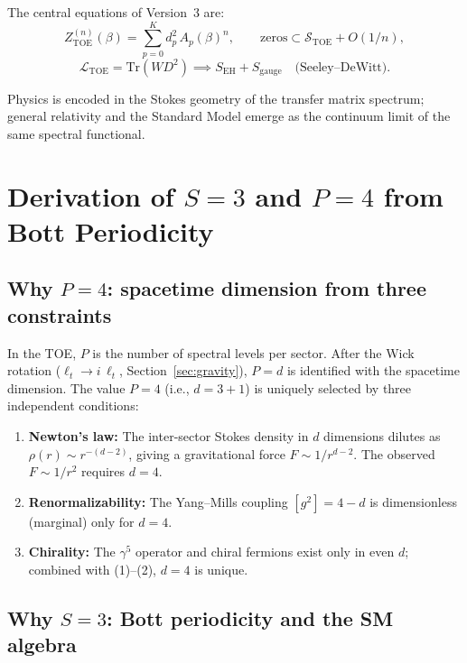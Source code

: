 \documentclass[12pt]{article}
\theoremstyle{definition}
\theoremstyle{remark}
\newcommand{\Tr}{\mathrm{Tr}}
\newcommand{\TOE}{\mathrm{TOE}}
\begin{document}
The central equations of Version~3 are:
\begin{equation}\label{eq:central}
\boxed{Z_\TOE^{(n)}(\beta)
= \sum_{p=0}^K d_p^2\,A_p(\beta)^n,
\qquad
\mathrm{zeros} \subset \mathcal{S}_\TOE + O(1/n),}
\end{equation}
\begin{equation}\label{eq:central2}
\boxed{\mathcal{L}_\TOE = \Tr(WD^2) \implies S_\mathrm{EH} + S_\mathrm{gauge}
\quad\text{(Seeley--DeWitt)}.}
\end{equation}

Physics is encoded in the Stokes geometry of the transfer matrix spectrum;
general relativity and the Standard Model emerge as the continuum limit
of the same spectral functional.

\section{Derivation of $S=3$ and $P=4$ from Bott Periodicity}
\label{sec:bott}

\subsection{Why $P=4$: spacetime dimension from three constraints}

In the TOE, $P$ is the number of spectral levels per sector.
After the Wick rotation ($\ell_t \to i\,\ell_t$, Section~\ref{sec:gravity}),
$P = d$ is identified with the spacetime dimension.  The value $P=4$
(i.e., $d = 3+1$) is uniquely selected by three independent conditions:
\begin{enumerate}
\item \textbf{Newton's law:} The inter-sector Stokes density in $d$
  dimensions dilutes as $\rho(r) \sim r^{-(d-2)}$, giving a gravitational
  force $F \sim 1/r^{d-2}$.  The observed $F \sim 1/r^2$ requires $d=4$.
\item \textbf{Renormalizability:} The Yang--Mills coupling $[g^2] = 4-d$ is
  dimensionless (marginal) only for $d=4$.
\item \textbf{Chirality:} The $\gamma^5$ operator and chiral fermions exist
  only in even $d$; combined with (1)--(2), $d=4$ is unique.
\end{enumerate}

\subsection{Why $S=3$: Bott periodicity and the SM algebra}
\end{document}
